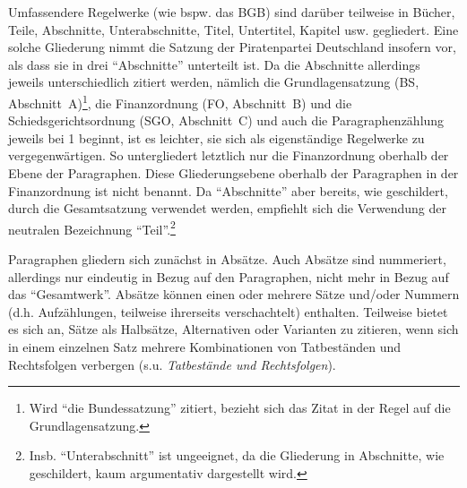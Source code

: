 Umfassendere Regelwerke (wie bspw. das BGB) sind darüber teilweise in Bücher, Teile, Abschnitte, Unterabschnitte, Titel, Untertitel, Kapitel usw. gegliedert.
Eine solche Gliederung nimmt die Satzung der Piratenpartei Deutschland insofern vor, als dass sie in drei \enquote{Abschnitte} unterteilt ist.
Da die Abschnitte allerdings jeweils unterschiedlich zitiert werden, nämlich die Grundlagensatzung (BS, Abschnitt~A)\footnote{Wird \enquote{die Bundessatzung} zitiert, bezieht sich das Zitat in der Regel auf die Grundlagensatzung.}, die Finanzordnung (FO, Abschnitt~B) und die Schiedsgerichtsordnung (SGO, Abschnitt~C) und auch die Paragraphenzählung jeweils bei 1 beginnt, ist es leichter, sie sich als eigenständige Regelwerke zu vergegenwärtigen.
So untergliedert letztlich nur die Finanzordnung oberhalb der Ebene der Paragraphen.
Diese Gliederungsebene oberhalb der Paragraphen in der Finanzordnung ist nicht benannt.
Da \enquote{Abschnitte} aber bereits, wie geschildert, durch die Gesamtsatzung verwendet werden, empfiehlt sich die Verwendung der neutralen Bezeichnung \enquote{Teil}.\footnote{Insb. \enquote{Unterabschnitt} ist ungeeignet, da die Gliederung in Abschnitte, wie geschildert, kaum argumentativ dargestellt wird.}

Paragraphen gliedern sich zunächst in Absätze.
Auch Absätze sind nummeriert, allerdings nur eindeutig in Bezug auf den Paragraphen, nicht mehr in Bezug auf das \enquote{Gesamtwerk}.
Absätze können einen oder mehrere Sätze und/oder Nummern (d.h. Aufzählungen, teilweise ihrerseits verschachtelt) enthalten.
Teilweise bietet es sich an, Sätze als Halbsätze, Alternativen oder Varianten zu zitieren, wenn sich in einem einzelnen Satz mehrere Kombinationen von Tatbeständen und Rechtsfolgen verbergen (s.u. \emph{Tatbestände und Rechtsfolgen}).

